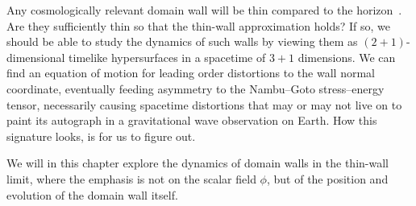



\newcommand*\hypsurf{\ALIAShypsurf}             %
\newcommand*\sppt{\ALIASsppt}                   %
\newcommand*\pert{\ALIASpert}                   %
\newcommand*\hypacc{\widehat}                   %
\newcommand*\Ft{\ALIASFt}                       %
\newcommand*\dummy{\ALIASdummy}                 %
\newcommand*\Tw{\ALIASTw}
\newcommand*\Twf{\ALIASTwf}







Any cosmologically relevant domain wall will be thin compared to the horizon~\citep{pressDynamicalEvolutionDomain1989}. Are they sufficiently thin so that the thin-wall approximation holds? If so, we should be able to study the dynamics of such walls by viewing them as $(2+1)$-dimensional timelike hypersurfaces in a spacetime of $3+1$ dimensions. We can find an equation of motion for leading order distortions to the wall normal coordinate, eventually feeding asymmetry to the Nambu--Goto stress--energy tensor, %
necessarily causing spacetime distortions that may or may not live on to paint its autograph in a gravitational wave observation on Earth. How this signature looks, is for us to figure out. 







We will in this chapter explore the dynamics of domain walls in the thin-wall limit, where the emphasis is not on the scalar field $\phi$, but of the position and evolution of the domain wall itself.



